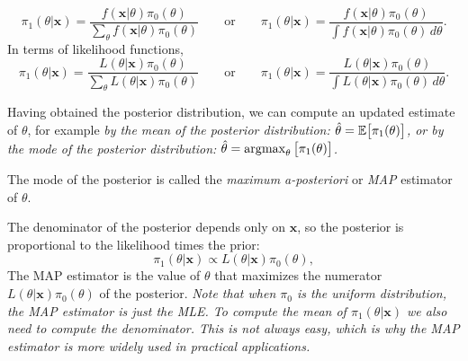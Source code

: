 \[
\pi_1(\theta|\mathbf{x}) 
	= \frac{f(\mathbf{x}|\theta)\pi_0(\theta)}{\sum_{\theta}f(\mathbf{x}|\theta)\pi_0(\theta)}
\qquad\text{or}\qquad
\pi_1(\theta|\mathbf{x}) 
	= \frac{f(\mathbf{x}|\theta)\pi_0(\theta)}{\int f(\mathbf{x}|\theta)\pi_0(\theta)\,d\theta}.
\]
In terms of likelihood functions,
\[
\pi_1(\theta|\mathbf{x}) 
	= \frac{L(\theta|\mathbf{x})\pi_0(\theta)}{\sum_{\theta}L(\theta|\mathbf{x})\pi_0(\theta)} 		
\qquad\text{or}\qquad	
\pi_1(\theta|\mathbf{x}) 
	= \frac{L(\theta|\mathbf{x})\pi_0(\theta)}{\int L(\theta|\mathbf{x})\pi_0(\theta)\,d\theta}.
\]

Having obtained the posterior distribution, we can compute an updated estimate of $\theta$, for example
\bit
\it by the mean of the posterior distribution: $\hat{\theta} = \mathbb{E}\big[\pi_1(\theta)\big]$, or
\it by the mode of the posterior distribution: $\hat{\theta} = \operatorname*{\arg\!\max}_{\theta}\big[\pi_1(\theta)\big]$.
\eit

\begin{definition}
The mode of the posterior is called the \emph{maximum a-posteriori} or \emph{MAP} estimator of $\theta$.
\end{definition}

\begin{remark}
The denominator of the posterior depends only on $\mathbf{x}$, so the posterior is proportional to the likelihood times the prior:
\[
\pi_1(\theta|\mathbf{x}) 	\propto L(\theta|\mathbf{x})\pi_0(\theta),
\]
The MAP estimator is the value of $\theta$ that maximizes the numerator $L(\theta|\mathbf{x})\pi_0(\theta)$ of the posterior.
\bit 
\it Note that when $\pi_0$ is the uniform distribution, the MAP estimator is just the MLE.
\eit
To compute the mean of $\pi_1(\theta|\mathbf{x})$ we also need to compute the denominator. This is not always easy, which is why the MAP estimator is more widely used in practical applications.
\end{remark}

